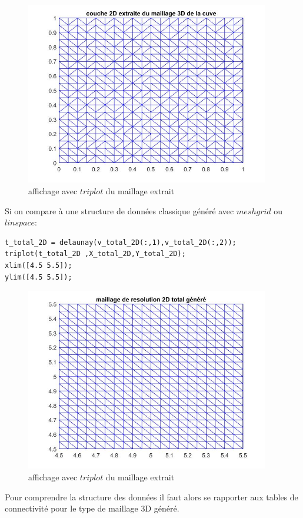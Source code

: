 \documentclass[a4paper,12pt,titlepage]{report}
\begin{document}
\begin{onehalfspace}
\begin{figure}[!h]
	\center
	\includegraphics[height = 8cm, keepaspectratio]{graphes/affichage_extraction_2D.jpg}
	\caption{\label{figure 3 } affichage avec $triplot$ du maillage extrait}
\end{figure}
Si on compare à une structure de données classique généré avec $meshgrid$ ou $linspace$:
\begin{verbatim}
t_total_2D = delaunay(v_total_2D(:,1),v_total_2D(:,2)); 
triplot(t_total_2D ,X_total_2D,Y_total_2D);
xlim([4.5 5.5]);
ylim([4.5 5.5]);
\end{verbatim} 
\begin{figure}[!h]
	\center
	\includegraphics[height = 8cm, keepaspectratio]{graphes/affichage_extraction_2D_normal.jpg}
	\caption{\label{figure 37 } affichage avec $triplot$ du maillage extrait}
\end{figure}
\newpage
Pour comprendre la structure des données il faut alors se rapporter  aux tables de connectivité pour le type de maillage 3D généré.
\begin{figure}[h]

\end{figure}
\end{onehalfspace}
\end{document}

